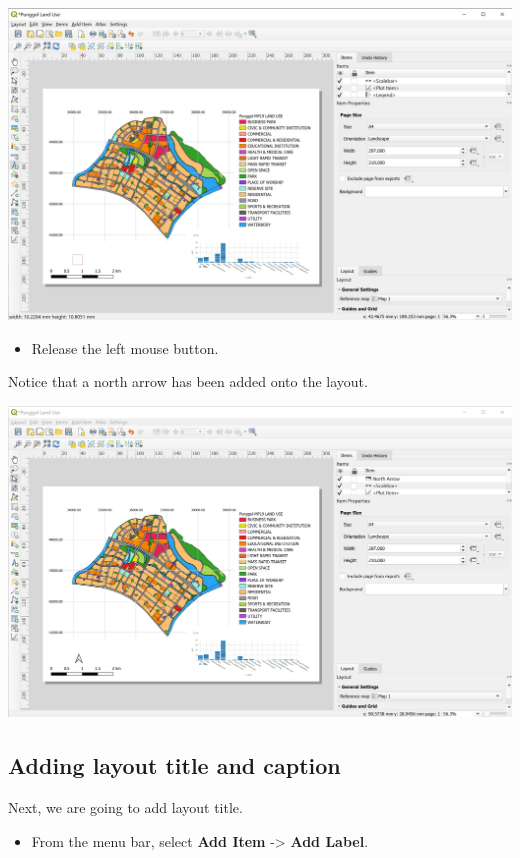 \documentclass[
  letterpaper,
  DIV=11,
  numbers=noendperiod]{scrreprt}
\providecommand{\tightlist}{%
  \setlength{\itemsep}{0pt}\setlength{\parskip}{0pt}}\usepackage{longtable,booktabs,array}
\begin{document}
\includegraphics{./img04/image80.jpg}

\begin{itemize}
\tightlist
\item
  Release the left mouse button.
\end{itemize}

Notice that a north arrow has been added onto the layout.

\includegraphics{./img04/image81.jpg}

\hypertarget{adding-layout-title-and-caption}{%
\subsection{Adding layout title and
caption}\label{adding-layout-title-and-caption}}

Next, we are going to add layout title.

\begin{itemize}
\tightlist
\item
  From the menu bar, select \textbf{Add Item} -\textgreater{}
  \textbf{Add Label}.
\end{itemize}
\end{document}
